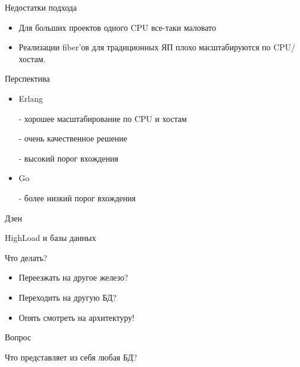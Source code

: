 \documentclass[aspectratio=169]{beamer}
\begin{document}
\begin{frame}{Недостатки подхода}
    \begin{itemize}
        \item Для больших проектов одного CPU все-таки маловато
        \item Реализации fiber'ов для традиционных
            ЯП плохо масштабируются по CPU/хостам.
    \end{itemize}
\end{frame}

\begin{frame}{Перспектива}
    \begin{itemize}
        \item Erlang
            \par - хорошее масштабирование по CPU и хостам
            \par - очень качественное решение
            \par - высокий порог вхождения
        \item Go
            \par - более низкий порог вхождения
    \end{itemize}
\end{frame}

\begin{frame}
    \begin{center}
        {\huge Дзен}
    \end{center}
\end{frame}


\begin{frame}{HighLoad и базы данных}
    \begin{block}{Что делать?}
        \begin{itemize}
            \item Переезжать на другое железо?
            \item Переходить на другую БД?
        \end{itemize}
        \par
        \begin{itemize}
            \pause\item Опять смотреть на архитектуру!
        \end{itemize}
    \end{block}
\end{frame}



\begin{frame}{Вопрос}
    \begin{center}
        {\huge Что представляет из себя любая БД?}
    \end{center}
\end{frame}
\end{document}
